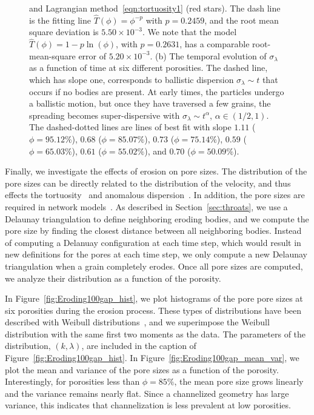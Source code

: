\documentclass[preprint,10pt]{elsarticle}
\begin{document}
\begin{figure}[H]
{and Lagrangian method~\eqref{eqn:tortuosity1} (red stars).  The dash
line is the fitting line $\widehat{T}(\phi)=\phi^{-p}$ with $p=0.2459$,
and the root mean square deviation is $5.50 \times 10^{-3}$.  We note
that the model $\widehat{T}(\phi) = 1 - p \ln (\phi)$, with $p=0.2631$,
has a comparable root-mean-square error of $5.20 \times 10^{-3}$.  (b)
The temporal evolution of $\sigma_\lambda$ as a function of time at six
different porosities.  The dashed line, which has slope one, corresponds
to ballistic dispersion $\sigma_\lambda \sim t$ that occurs if no bodies
are present.  At early times, the particles undergo a ballistic motion,
but once they have traversed a few grains, the spreading becomes
super-dispersive with $\sigma_\lambda \sim t^{\alpha}$, $\alpha \in
(1/2,1)$.  The dashed-dotted lines are lines of best fit with slope
$1.11$ ($\phi=95.12\%$), $0.68$ ($\phi=85.07\%$), $0.73$
($\phi=75.14\%$), $0.59$ ($\phi=65.03\%$), $0.61$ ($\phi=55.02\%$), and
$0.70$ ($\phi=50.09\%$).}
\end{figure}

Finally, we investigate the effects of erosion on pore sizes.  The
distribution of the pore sizes can be directly related to the
distribution of the velocity, and thus effects the
tortuosity~\cite{den-ica-hid2018} and anomalous
dispersion~\cite{dea-qua-bir-jua2018}. In addition, the pore sizes are
required in network models~\cite{bry-mel-cad1993, bry-kin-mel1993}.  As
described in Section~\ref{sec:throats}, we use a Delaunay triangulation
to define neighboring eroding bodies, and we compute the pore size by
finding the closest distance between all neighboring bodies.  Instead of
computing a Delanuay configuration at each time step, which would result
in new definitions for the pores at each time step, we only compute a
new Delaunay triangulation when a grain completely erodes.  Once all
pore sizes are computed, we analyze their distribution as a function of
the porosity.  

In Figure~\ref{fig:Eroding100gap_hist}, we plot
histograms of the pore pore sizes at six porosities during the erosion
process. These types of distributions have been described with Weibull
distributions~\cite{ioa-cha1993}, and we superimpose the Weibull
distribution with the same first two moments as the data.  The
parameters of the distribution, $(k,\lambda)$, are included in the
caption of Figure~\ref{fig:Eroding100gap_hist}.  In
Figure~\ref{fig:Eroding100gap_mean_var}, we plot the mean and variance
of the pore sizes as a function of the porosity.  Interestingly, for
porosities less than $\phi = 85\%$, the mean pore size grows linearly
and the variance remains nearly flat. Since a channelized geometry has
large variance, this indicates that channelization is less prevalent at
low porosities.
\end{document}
